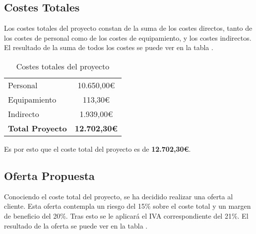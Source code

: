 \subsection{Costes Totales}\label{subsec:costes_totales}

Los costes totales del proyecto constan de la suma de los costes directos, tanto de los costes de personal como de los costes de equipamiento, y los costes indirectos. El resultado de la suma de todos los costes se puede ver en la tabla .

\begin{table}[htbp]
    \centering
    \caption{Costes totales del proyecto}
    \label{tab:costes_totales}
    \begin{tabular}{@{}lc@{}}
    \toprule
    Personal                & 10.650,00\euro \\
    Equipamiento            & 113,30\euro    \\
    Indirecto               & 1.939,00\euro  \\ \midrule
    \textbf{Total Proyecto} & \textbf{12.702,30\euro} \\ \bottomrule
    \end{tabular}
    \end{table}

Es por esto que el coste total del proyecto es de \textbf{12.702,30\euro}.

\subsection{Oferta Propuesta}\label{subsec:oferta_propuesta}

Conociendo el coste total del proyecto, se ha decidido realizar una oferta al cliente. Esta oferta contempla un riesgo del 15\% sobre el coste total y un margen de beneficio del 20\%. Tras esto se le aplicará el IVA correspondiente del 21\%. El resultado de la oferta se puede ver en la tabla .


